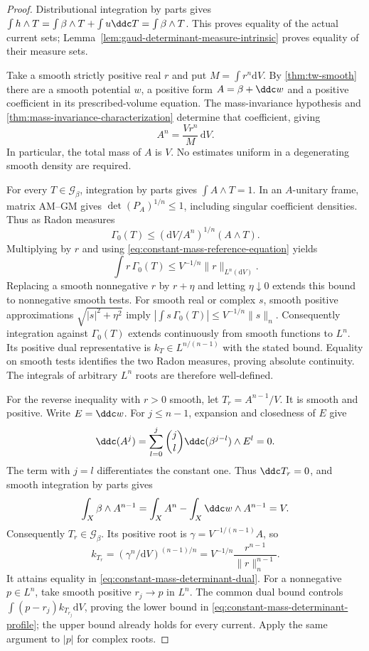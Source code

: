 \begin{proof}
Distributional integration by parts gives
$\int h\wedge T=\int\beta\wedge T+\int u\ddc T
=\int\beta\wedge T$. This proves equality of the actual current
sets; Lemma~\ref{lem:gaud-determinant-measure-intrinsic} proves equality of their measure sets.

Take a smooth strictly positive real $r$ and put $M=\int r^n \mathrm dV$.
By \cref{thm:tw-smooth} there are a smooth potential $w$, a positive form $A=\beta+\ddc w$ and a positive coefficient in its prescribed-volume equation. The mass-invariance hypothesis and \cref{thm:mass-invariance-characterization} determine that coefficient, giving
\begin{equation}\label{eq:constant-mass-reference-equation}
 A^n=\frac{Vr^n}{M}\,\mathrm dV.
\end{equation}
In particular, the total mass of $A$ is $V$. No estimates uniform in a degenerating smooth density are required.

For every $T\in\mathscr G_\beta$, integration by parts gives
$\int A\wedge T=1$. In an $A$-unitary frame, matrix AM--GM gives
$\det(P_A)^{1/n}\leq1$, including singular coefficient densities.
Thus as Radon measures
\[
 \Gamma_0(T)\leq
       (\mathrm dV/A^n)^{1/n}(A\wedge T).
\]
Multiplying by $r$ and using \eqref{eq:constant-mass-reference-equation} yields
\begin{equation}\label{eq:constant-mass-determinant-dual}
 \int r\,\Gamma_0(T)\leq V^{-1/n}\|r\|_{L^n(\mathrm dV)}.
\end{equation}
Replacing a smooth nonnegative $r$ by $r+\eta$ and letting
$\eta\downarrow0$ extends this bound to nonnegative smooth tests.
For smooth real or complex $s$, smooth positive approximations
$\sqrt{|s|^2+\eta^2}$ imply
$|\int s\,\Gamma_0(T)|\leq V^{-1/n}\|s\|_n$.
Consequently integration against $\Gamma_0(T)$ extends continuously
from smooth functions to $L^n$. Its positive dual representative is
$k_T\in L^{n/(n-1)}$ with the stated bound. Equality on smooth
tests identifies the two Radon measures, proving absolute continuity.
The integrals of arbitrary $L^n$ roots are therefore well-defined.

For the reverse inequality with $r>0$ smooth, let
$T_r=A^{n-1}/V$. It is smooth and positive. Write $E=\ddc w$. For $j\leq n-1$, expansion and closedness of $E$ give
\[
 \ddc(A^j)=\sum_{l=0}^j\binom jl\ddc(\beta^{j-l})\wedge E^l=0.
\]
The term with $j=l$ differentiates the constant one. Thus $\ddc T_r=0$, and smooth integration by parts gives
\[
 \int_X\beta\wedge A^{n-1}
 =\int_X A^n-\int_X\ddc w\wedge A^{n-1}=V.
\]
Consequently $T_r\in\mathscr G_\beta$.
Its positive root is $\gamma=V^{-1/(n-1)}A$, so
\[
 k_{T_r}=(\gamma^n/\mathrm dV)^{(n-1)/n}
       =V^{-1/n}\frac{r^{n-1}}{\|r\|_n^{n-1}}.
\]
It attains equality in \eqref{eq:constant-mass-determinant-dual}. For a nonnegative
$p\in L^n$, take smooth positive $r_j\to p$ in $L^n$. The common
dual bound controls $\int(p-r_j)k_{T_{r_j}}\mathrm dV$, proving the lower
bound in \eqref{eq:constant-mass-determinant-profile}; the upper bound already holds for
every current. Apply the same argument to $|p|$ for complex roots.
\end{proof}
